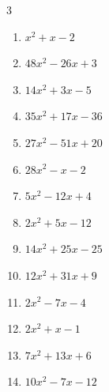 \begin{multicols}{3}
\begin{enumerate}
        \phantom{$=(3x+2)(8x+1)$}

  \item $x^{2}+x-2$

        \phantom{$=(x-1)(x+2)$}

  \item $48x^{2}-26x+3$

        \phantom{$=(8x-3)(6x-1)$}

  \item $14x^{2}+3x-5$

        \phantom{$=(7x+5)(2x-1)$}

  \item $35x^{2}+17x-36$

        \phantom{$=(5x-4)(7x+9)$}

\columnbreak %

  \item $27x^{2}-51x+20$

        \phantom{$=(9x-5)(3x-4)$}

  \item $28x^{2}-x-2$

        \phantom{$=(7x-2)(4x+1)$}

  \item $5x^{2}-12x+4$

        \phantom{$=(x-2)(5x-2)$}

  \item $2x^{2}+5x-12$

        \phantom{$=(x+4)(2x-3)$}

  \item $14x^{2}+25x-25$

        \phantom{$=(2x+5)(7x-5)$}

  \item $12x^{2}+31x+9$

        \phantom{$=(4x+9)(3x+1)$}

  \item $2x^{2}-7x-4$

        \phantom{$=(x-4)(2x+1)$}

  \item $2x^{2}+x-1$

        \phantom{$=(2x-1)(x+1)$}

  \item $7x^{2}+13x+6$

        \phantom{$=(x+1)(7x+6)$}

  \item $10x^{2}-7x-12$

        \phantom{$=(2x-3)(5x+4)$}


\end{enumerate}
\end{multicols}
